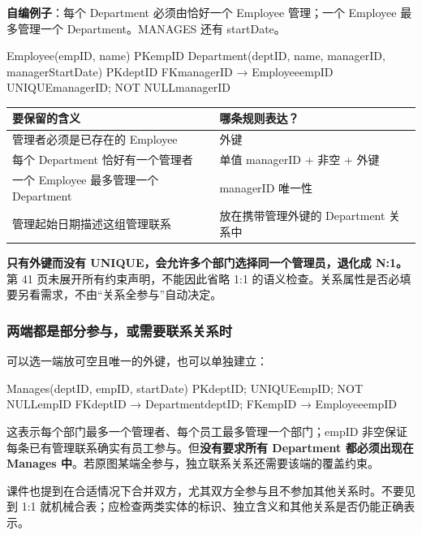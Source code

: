 \textbf{自编例子}：每个 Department 必须由恰好一个 Employee 管理；一个 Employee 最多管理一个 Department。MANAGES 还有 startDate。

\begin{StudyCode}
Employee(empID, name)                      PK{empID}
Department(deptID, name, managerID, managerStartDate)
  PK{deptID}
  FK{managerID} → Employee{empID}
  UNIQUE{managerID}; NOT NULL{managerID}
\end{StudyCode}

\begin{longtable}[]{@{}ll@{}}
\toprule\noalign{}
要保留的含义 & 哪条规则表达？ \\
\midrule\noalign{}
\endhead
\bottomrule\noalign{}
\endlastfoot
管理者必须是已存在的 Employee & 外键 \\
每个 Department 恰好有一个管理者 & 单值 managerID + 非空 + 外键 \\
一个 Employee 最多管理一个 Department & managerID 唯一性 \\
管理起始日期描述这组管理联系 & 放在携带管理外键的 Department 关系中 \\
\end{longtable}

\textbf{只有外键而没有 UNIQUE，会允许多个部门选择同一个管理员，退化成 N:1。} 第 41 页未展开所有约束声明，不能因此省略 1:1 的语义检查。关系属性是否必填要另看需求，不由``关系全参与''自动决定。

\subsubsection{两端都是部分参与，或需要联系关系时}\label{04_er_to_relational_mapping_zh-ux4e24ux7aefux90fdux662fux90e8ux5206ux53c2ux4e0eux6216ux9700ux8981ux8054ux7cfbux5173ux7cfbux65f6}

可以选一端放可空且唯一的外键，也可以单独建立：

\begin{StudyCode}
Manages(deptID, empID, startDate)
PK{deptID}; UNIQUE{empID}; NOT NULL{empID}
FK{deptID} → Department{deptID}; FK{empID} → Employee{empID}
\end{StudyCode}

这表示每个部门最多一个管理者、每个员工最多管理一个部门；empID 非空保证每条已有管理联系确实有员工参与。但\textbf{没有要求所有 Department 都必须出现在 Manages 中}。若原图某端全参与，独立联系关系还需要该端的覆盖约束。

课件也提到在合适情况下合并双方，尤其双方全参与且不参加其他关系时。不要见到 1:1 就机械合表；应检查两类实体的标识、独立含义和其他关系是否仍能正确表示。

